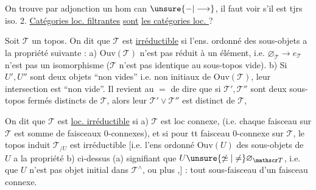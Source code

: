 On trouve par adjonction un hom can $\unsure{-|\longrightarrow}$, il faut voir s'il est tjrs iso.
2. \uline{Catégories loc. filtrantes} \uline{sont} \uline{les catégories loc.  } ?

Soit $\mathscr T$ un topos. On dit que $\mathscr T$ est \uline{irréductible}  si l'ens. ordonné  des sous-objets    a la propriété suivante :
a) $\mathrm{Ouv}(\mathscr T)$ n'est pas réduit à un élément, i.e. $\varnothing_{\mathscr T}\to e_{\mathscr T}$ n'est pas un isomorphisme ($\mathscr T$ n'est pas identique  au sous-topos vide).
b) Si $U',U''$ sont deux objets ``non vides'' i.e. non initiaux de $\mathrm{Ouv}(\mathscr T)$, leur  intersection est ``non vide''.
Il revient au $=$ de dire que si $\mathscr T',\mathscr T''$ sont deux sous-topos fermés distincts de $\mathscr T$, alors  leur  $\mathscr T'\vee\mathscr T''$ est distinct de $\mathscr T$, 

On dit que $\mathscr T$ est \uline{loc. irréductible} si 
a) $\mathscr T$ est loc connexe,  (i.e. chaque faisceau sur $\mathscr T$ est somme de faisceaux 0-connexes),
et si  pour tt faisceau 0-connexe  sur $\mathscr T$, le topos induit $\mathscr T_{/U}$ est irréductible  [i.e. l'ens  ordonné $\mathrm{Ouv}(U)$ des sous-objets de $U$\unsure{,} a la propriété b) ci-dessus (a) signifiant  que  $U\unsure{\not\simeq|\ne}\varnothing_{\mathscr T}$\unsure{\}}, i.e. que $U$ n'est pas objet initial dans $\mathscr T^{\wedge}$\unsure{\}}, ou plus ,] :  tout sous-faisceau d'un faisceau   connexe.

